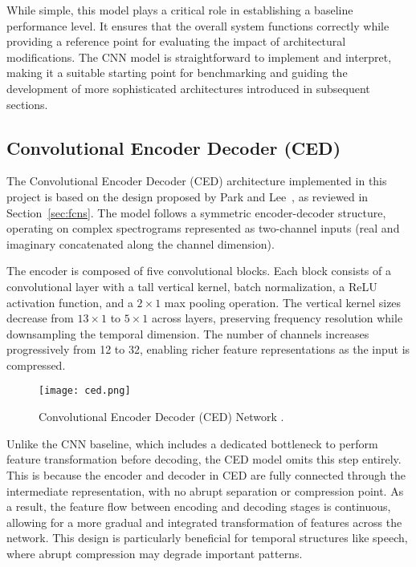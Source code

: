 While simple, this model plays a critical role in establishing a baseline performance level. It ensures that the overall system functions correctly while providing a reference point for evaluating the impact of architectural modifications. The CNN model is straightforward to implement and interpret, making it a suitable starting point for benchmarking and guiding the development of more sophisticated architectures introduced in subsequent sections.

\subsection{Convolutional Encoder Decoder (CED)}
\label{sec:ced}

The Convolutional Encoder Decoder (CED) architecture implemented in this project is based on the design proposed by Park and Lee~\cite{park2017acoustic}, as reviewed in Section~\ref{sec:fcns}. The model follows a symmetric encoder-decoder structure, operating on complex spectrograms represented as two-channel inputs (real and imaginary concatenated along the channel dimension).

The encoder is composed of five convolutional blocks. Each block consists of a convolutional layer with a tall vertical kernel, batch normalization, a ReLU activation function, and a \(2 \times 1\) max pooling operation. The vertical kernel sizes decrease from \(13 \times 1\) to \(5 \times 1\) across layers, preserving frequency resolution while downsampling the temporal dimension. The number of channels increases progressively from 12 to 32, enabling richer feature representations as the input is compressed.

\begin{figure}[h]
    \centering
    \texttt{[image: ced.png]}
    \caption{\label{fig:ced}Convolutional Encoder Decoder (CED) Network \cite{park2017acoustic}.}
\end{figure}

Unlike the CNN baseline, which includes a dedicated bottleneck to perform feature transformation before decoding, the CED model omits this step entirely. This is because the encoder and decoder in CED are fully connected through the intermediate representation, with no abrupt separation or compression point. As a result, the feature flow between encoding and decoding stages is continuous, allowing for a more gradual and integrated transformation of features across the network. This design is particularly beneficial for temporal structures like speech, where abrupt compression may degrade important patterns.

